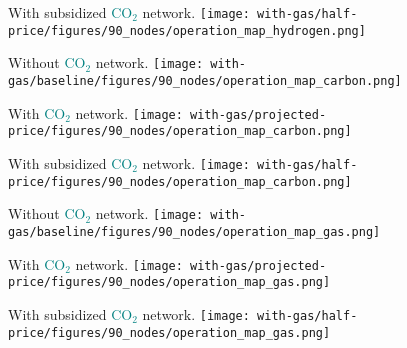 \documentclass[12pt, aspectratio=169]{beamer}
\newcommand{\carbon}{\textcolor{teal}{CO$_2$}}
\begin{document}
\begin{frame}
    \begin{center}
    With subsidized \carbon{} network.
    \texttt{[image: with-gas/half-price/figures/90\_nodes/operation\_map\_hydrogen.png]}
    \end{center}
\end{frame}



\begin{frame}
    \begin{center}
    Without \carbon{} network.
    \texttt{[image: with-gas/baseline/figures/90\_nodes/operation\_map\_carbon.png]}
    \end{center}
\end{frame}


\begin{frame}
    \begin{center}
    With \carbon{} network.
    \texttt{[image: with-gas/projected-price/figures/90\_nodes/operation\_map\_carbon.png]}
    \end{center}
\end{frame}

\begin{frame}
    \begin{center}
    With subsidized \carbon{} network.
    \texttt{[image: with-gas/half-price/figures/90\_nodes/operation\_map\_carbon.png]}
    \end{center}
\end{frame}



\begin{frame}
    \begin{center}
    Without \carbon{} network.
    \texttt{[image: with-gas/baseline/figures/90\_nodes/operation\_map\_gas.png]}
    \end{center}
\end{frame}


\begin{frame}
    \begin{center}
    With \carbon{} network.
    \texttt{[image: with-gas/projected-price/figures/90\_nodes/operation\_map\_gas.png]}
    \end{center}
\end{frame}

\begin{frame}
    \begin{center}
    With subsidized \carbon{} network.
    \texttt{[image: with-gas/half-price/figures/90\_nodes/operation\_map\_gas.png]}
    \end{center}
\end{frame}
\end{document}
